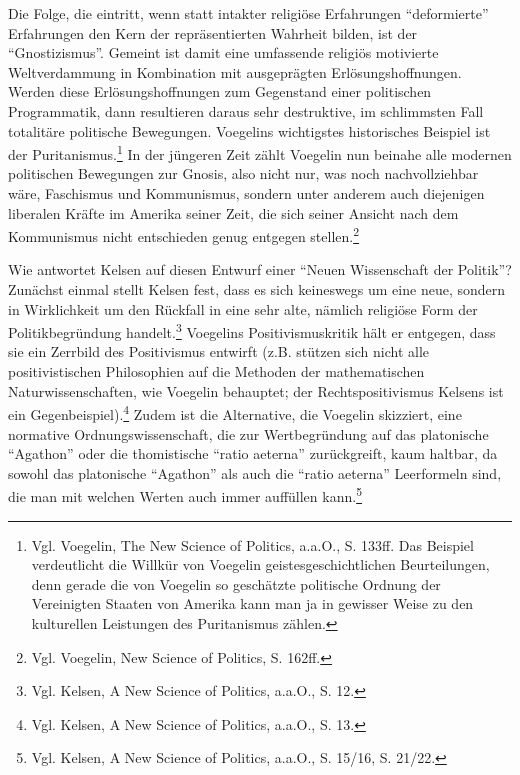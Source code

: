 \documentclass[12pt,a4paper,ngerman]{article}
\begin{document}
Die Folge, die eintritt, wenn statt intakter religiöse Erfahrungen
"`deformierte"' Erfahrungen den Kern der repräsentierten Wahrheit bilden, ist
der "`Gnostizismus"'.  Gemeint ist damit eine umfassende religiös motivierte
Weltverdammung in Kombination mit ausgeprägten Erlösungshoffnungen. Werden
diese Erlösungshoffnungen zum Gegenstand einer politischen Programmatik, dann
resultieren daraus sehr destruktive, im schlimmsten Fall totalitäre politische
Bewegungen. Voegelins wichtigstes historisches Beispiel ist der
Puritanismus.\footnote{Vgl. Voegelin, The New Science of Politics, a.a.O., S.
  133ff. Das Beispiel verdeutlicht die Willkür von Voegelin
  geistesgeschichtlichen Beurteilungen, denn gerade die von Voegelin so
  geschätzte politische Ordnung der Vereinigten Staaten von Amerika kann man
  ja in gewisser Weise zu den kulturellen Leistungen des Puritanismus zählen.}
In der jüngeren Zeit zählt Voegelin nun beinahe alle modernen politischen
Bewegungen zur Gnosis, also nicht nur, was noch nachvollziehbar wäre,
Faschismus und Kommunismus, sondern unter anderem auch diejenigen liberalen
Kräfte im Amerika seiner Zeit, die sich seiner Ansicht nach dem Kommunismus
nicht entschieden genug entgegen stellen.\footnote{Vgl.  Voegelin, New Science
  of Politics, S.  162ff.}

Wie antwortet Kelsen auf diesen Entwurf einer "`Neuen Wissenschaft der
Politik"'? Zunächst einmal stellt Kelsen fest, dass es sich keineswegs um eine
neue, sondern in Wirklichkeit um den Rückfall in eine sehr alte, nämlich
religiöse Form der Politikbegründung handelt.\footnote{Vgl. Kelsen, A New
  Science of Politics, a.a.O., S. 12.} Voegelins Positivismuskritik hält er
entgegen, dass sie ein Zerrbild des Positivismus entwirft (z.B. stützen sich
nicht alle positivistischen Philosophien auf die Methoden der mathematischen
Naturwissenschaften, wie Voegelin behauptet; der Rechtspositivismus Kelsens
ist ein Gegenbeispiel).\footnote{Vgl. Kelsen, A New Science of Politics,
  a.a.O., S. 13.}  Zudem ist die Alternative, die Voegelin skizziert, eine
normative Ordnungswissenschaft, die zur Wertbegründung auf das platonische
"`Agathon"' oder die thomistische "`ratio aeterna"' zurückgreift, kaum
haltbar, da sowohl das platonische "`Agathon"' als auch die "`ratio aeterna"'
Leerformeln sind, die man mit welchen Werten auch immer auf\/füllen
kann.\footnote{Vgl. Kelsen, A New Science of Politics, a.a.O., S. 15/16, S.
  21/22.}
\end{document}

